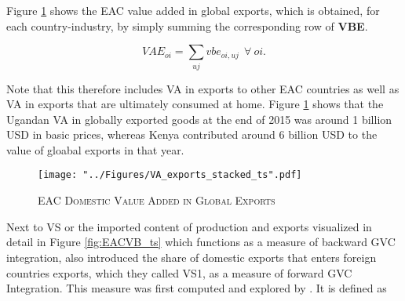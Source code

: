 \documentclass[a4paper]{article}
\begin{document}


Figure \ref{fig:VAexp} shows the EAC value added in global exports, which is obtained, for each country-industry, by simply summing the corresponding row of \textbf{VBE}.

\begin{equation} \label{eq:VAE}
VAE_{oi} = \sum_{uj} vbe_{oi, uj}\ \ \forall\ oi.
\end{equation}

 Note that this therefore includes VA in exports to other EAC countries as well as VA in exports that are ultimately consumed at home. Figure \ref{fig:VAexp} shows that the Ugandan VA in globally exported goods at the end of 2015 was around 1 billion USD in basic prices, whereas Kenya contributed around 6 billion USD to the value of gloabal exports in that year. 


\begin{figure}[h!]
\centering
\caption{\label{fig:VAexp}\textsc{EAC Domestic Value Added in Global Exports}}
\texttt{[image: "../Figures/VA\_exports\_stacked\_ts".pdf]} %
\end{figure}
\FloatBarrier

Next to VS or the imported content of production and exports visualized in detail in Figure \ref{fig:EACVB_ts} which functions as a measure of backward GVC integration, \citet{hummels2001nature} also introduced the share of domestic exports that enters foreign countries exports, which they called VS1, as a measure of forward GVC Integration. This measure was first computed and explored by \citet{daudin2011produces}. It is defined as 
\end{document}
